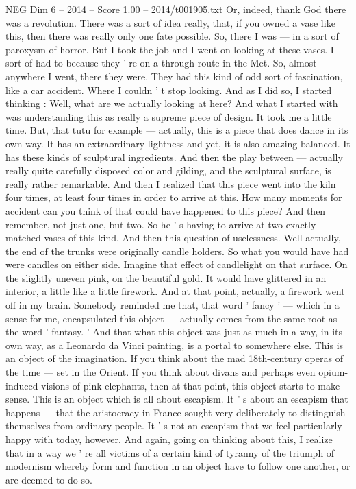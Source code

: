 \begin{textsample}{NEG Dim 6 – 2014 – Score 1.00 – 2014/t001905.txt}
Or, indeed, thank God there was a revolution.
There was a sort of idea really, that, if you owned a vase like this, then there was really only one fate possible.
So, there I was — in a sort of paroxysm of horror.
But I took the job and I went on looking at these vases.
I sort of had to because they ' re on a through route in the Met.
So, almost anywhere I went, there they were.
They had this kind of odd sort of fascination, like a car accident.
Where I couldn ' t stop looking.
And as I did so, I started thinking : Well, what are we actually looking at here?
And what I started with was understanding this as really a supreme piece of design.
It took me a little time.
But, that tutu for example — actually, this is a piece that does dance in its own way.
It has an extraordinary lightness and yet, it is also amazing balanced.
It has these kinds of sculptural ingredients.
And then the play between — actually really quite carefully disposed color and gilding, and the sculptural surface, is really rather remarkable.
And then I realized that this piece went into the kiln four times, at least four times in order to arrive at this.
How many moments for accident can you think of that could have happened to this piece?
And then remember, not just one, but two.
So he ' s having to arrive at two exactly matched vases of this kind.
And then this question of uselessness.
Well actually, the end of the trunks were originally candle holders.
So what you would have had were candles on either side.
Imagine that effect of candlelight on that surface.
On the slightly uneven pink, on the beautiful gold.
It would have glittered in an interior, a little like a little firework.
And at that point, actually, a firework went off in my brain.
Somebody reminded me that, that word ' fancy ' — which in a sense for me, encapsulated this object — actually comes from the same root as the word ' fantasy. ' And that what this object was just as much in a way, in its own way, as a Leonardo da Vinci painting, is a portal to somewhere else.
This is an object of the imagination.
If you think about the mad 18th-century operas of the time — set in the Orient.
If you think about divans and perhaps even opium-induced visions of pink elephants, then at that point, this object starts to make sense.
This is an object which is all about escapism.
It ' s about an escapism that happens — that the aristocracy in France sought very deliberately to distinguish themselves from ordinary people.
It ' s not an escapism that we feel particularly happy with today, however.
And again, going on thinking about this, I realize that in a way we ' re all victims of a certain kind of tyranny of the triumph of modernism whereby form and function in an object have to follow one another, or are deemed to do so.

\end{textsample}
